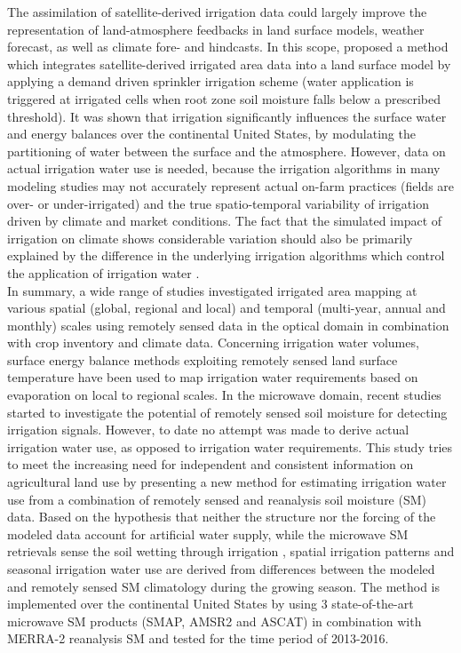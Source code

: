 \documentclass[hess, manuscript]{copernicus}
\begin{document}
The assimilation of satellite-derived irrigation data could largely improve the representation of land-atmosphere feedbacks in land surface models, weather forecast, as well as climate fore- and hindcasts. In this scope, \citet{Ozdogan_2010} proposed a method which integrates satellite-derived irrigated area data into a land surface model by applying a demand driven sprinkler irrigation scheme (water application is triggered at irrigated cells when root zone soil moisture falls below a prescribed threshold). It was shown that irrigation significantly influences the surface water and energy balances over the continental United States, by modulating the partitioning of water between the surface and the atmosphere. However, data on actual irrigation water use is needed, because the irrigation algorithms in many modeling studies may not accurately represent actual on-farm practices (fields are over- or under-irrigated) and the true spatio-temporal variability of irrigation driven by climate and market conditions. The fact that the simulated impact of irrigation on climate shows considerable variation should also be primarily explained by the difference in the underlying irrigation algorithms which control the application of irrigation water \citep{sacks-2009}.\\

In summary, a wide range of studies investigated irrigated area mapping at various spatial (global, regional and local) and temporal (multi-year, annual and monthly) scales using remotely sensed data in the optical domain in combination with crop inventory and climate data. Concerning irrigation water volumes, surface energy balance methods exploiting remotely sensed land surface temperature have been used to map irrigation water requirements based on evaporation on local to regional scales. In the microwave domain, recent studies started to investigate the potential of remotely sensed soil moisture for detecting irrigation signals. However, to date no attempt was made to derive actual irrigation water use, as opposed to irrigation water requirements.
This study tries to meet the increasing need for independent and consistent information on agricultural land use by presenting a new method for estimating irrigation water use from a combination of remotely sensed and reanalysis soil moisture (SM) data. Based on the hypothesis that neither the structure nor the forcing of the modeled data account for artificial water supply, while the microwave SM retrievals sense the soil wetting through irrigation \citep{Kumar_2015, escorihuela2016comparison}, spatial irrigation patterns and seasonal irrigation water use are derived from differences between the modeled and remotely sensed SM climatology during the growing season. The method is implemented over the continental United States by using 3 state-of-the-art microwave SM products (SMAP, AMSR2 and ASCAT) in combination with MERRA-2 reanalysis SM and tested for the time period of 2013-2016.\\
\end{document}
